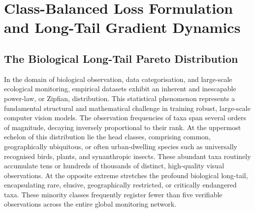\chapter{Class-Balanced Loss Formulation and Long-Tail Gradient Dynamics}
\label{ch:class_balanced_loss}


\section{The Biological Long-Tail Pareto Distribution}
\label{sec:biological_long_tail}

In the domain of biological observation, data categorisation, and large-scale ecological monitoring, empirical datasets exhibit an inherent and inescapable power-law, or Zipfian, distribution. This statistical phenomenon represents a fundamental structural and mathematical challenge in training robust, large-scale computer vision models. The observation frequencies of taxa span several orders of magnitude, decaying inversely proportional to their rank. At the uppermost echelon of this distribution lie the head classes, comprising common, geographically ubiquitous, or often urban-dwelling species such as universally recognised birds, plants, and synanthropic insects. These abundant taxa routinely accumulate tens or hundreds of thousands of distinct, high-quality visual observations. At the opposite extreme stretches the profound biological long-tail, encapsulating rare, elusive, geographically restricted, or critically endangered taxa. These minority classes frequently register fewer than five verifiable observations across the entire global monitoring network.

